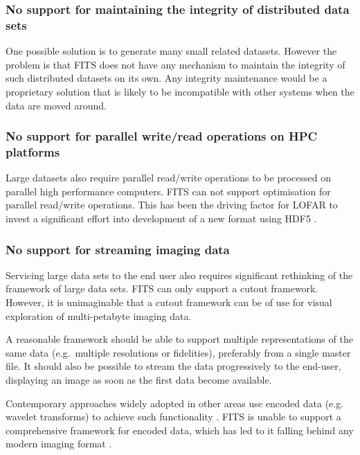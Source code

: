\documentclass[final,authoryear,5p,times,twocolumn]{elsarticle}
\begin{document}
\subsubsection{No support for maintaining the integrity of distributed data sets}

One possible solution is to generate many small related datasets. However
the problem is that FITS does not have any mechanism to maintain the
integrity of such distributed datasets on its own. Any integrity
maintenance would be a proprietary solution that is likely to be
incompatible with other systems when the data are moved around.

\subsubsection{No support for parallel write/read operations on HPC platforms}

Large datasets also require parallel read/write operations to be processed on parallel high performance
computers. FITS can not support optimisation for parallel read/write operations. This has been
the driving factor for LOFAR to invest a significant effort into development of a new format using
HDF5  \citep{2012ASPC..461..283A}.

\subsubsection{No support for streaming imaging data}

Servicing large data sets to the end user also requires significant
rethinking of the framework of large data sets. FITS can only support a
cutout framework.  However, it is unimaginable that a cutout framework
can be of use for visual exploration of multi-petabyte imaging data.

A reasonable framework should be able to support multiple representations
of the same data (e.g.\ multiple resolutions or fidelities), preferably
from a single master file. It should also be possible to stream the data
progressively to the end-user, displaying an image as soon
as the first data become available.

Contemporary approaches widely adopted in other areas use encoded data
(e.g. wavelet transforms) to achieve such functionality \citep{2003SPIE.5150..791T}. FITS is unable to support
a comprehensive framework for encoded data, which has led to it
falling behind any modern imaging format \citep[see e.g.][]{2013arXiv1307.5123K}.
\end{document}
